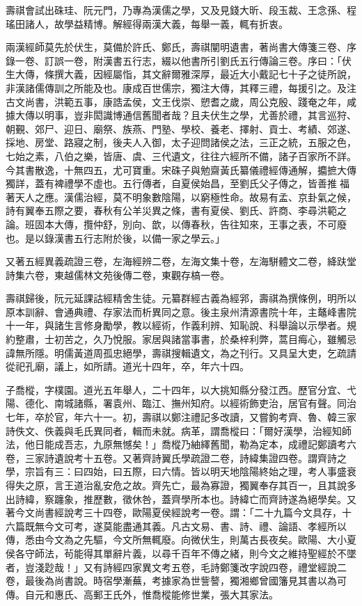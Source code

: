 \begin{pinyinscope}
壽祺會試出硃珪、阮元門，乃專為漢儒之學，又及見錢大昕、段玉裁、王念孫、程瑤田諸人，故學益精博。解經得兩漢大義，每舉一義，輒有折衷。

兩漢經師莫先於伏生，莫備於許氏、鄭氏，壽祺闡明遺書，著尚書大傳箋三卷、序錄一卷、訂誤一卷，附漢書五行志，綴以他書所引劉氏五行傳論三卷。序曰：「伏生大傳，條撰大義，因經屬恉，其文辭爾雅深厚，最近大小戴記七十子之徒所說，非漢諸儒傳訓之所能及也。康成百世儒宗，獨注大傳，其釋三禮，每援引之。及注古文尚書，洪範五事，康誥孟侯，文王伐崇、愬耆之歲，周公克殷、踐奄之年，咸據大傳以明事，豈非閎識博通信舊聞者哉？且夫伏生之學，尤善於禮，其言巡狩、朝覲、郊尸、迎日、廟祭、族燕、門塾、學校、養老、擇射、貢士、考績、郊遂、採地、房堂、路寢之制，後夫人入御，太子迎問諸侯之法，三正之統，五服之色，七始之素，八伯之樂，皆唐、虞、三代遺文，往往六經所不備，諸子百家所不詳。今其書散逸，十無四五，尤可寶重。宋硃子與勉齋黃氏纂儀禮經傳通解，攟摭大傳獨詳，蓋有裨禮學不虛也。五行傳者，自夏侯始昌，至劉氏父子傳之，皆善推福著天人之應。漢儒治經，莫不明象數陰陽，以窮極性命。故易有孟、京卦氣之候，詩有翼奉五際之要，春秋有公羊災異之條，書有夏侯、劉氏、許商、李尋洪範之論。班固本大傳，攬仲舒，別向、歆，以傳春秋，告往知來，王事之表，不可廢也。是以錄漢書五行志附於後，以備一家之學云。」

又著五經異義疏證三卷，左海經辨二卷，左海文集十卷，左海駢體文二卷，絳趺堂詩集六卷，東越儒林文苑後傳二卷，東觀存槁一卷。

壽祺歸後，阮元延課詁經精舍生徒。元纂群經古義為經郛，壽祺為撰條例，明所以原本訓辭、會通典禮、存家法而析異同之意。後主泉州清源書院十年，主鼇峰書院十一年，與諸生言修身勵學，教以經術，作義利辨、知恥說、科舉論以示學者。規約整肅，士初苦之，久乃悅服。家居與諸當事書，於桑梓利弊，蒿目痗心，雖觸忌諱無所隱。明儒黃道周孤忠絕學，壽祺搜輯遺文，為之刊行。又具呈大吏，乞疏請從祀孔廟，議上，如所請。道光十四年，卒，年六十四。

子喬樅，字樸園。道光五年舉人，二十四年，以大挑知縣分發江西。歷官分宜、弋陽、德化、南城諸縣，署袁州、臨江、撫州知府。以經術飾吏治，居官有聲。同治七年，卒於官，年六十一。初，壽祺以鄭注禮記多改讀，又嘗鉤考齊、魯、韓三家詩佚文、佚義與毛氏異同者，輯而未就。病革，謂喬樅曰：「爾好漢學，治經知師法，他日能成吾志，九原無憾矣！」喬樅乃紬繹舊聞，勒為定本，成禮記鄭讀考六卷，三家詩遺說考十五卷。又著齊詩翼氏學疏證二卷，詩緯集證四卷。謂齊詩之學，宗旨有三：曰四始，曰五際，曰六情。皆以明天地陰陽終始之理，考人事盛衰得失之原，言王道治亂安危之故。齊先亡，最為寡證，獨翼奉存其百一，且其說多出詩緯，察躔象，推歷數，徵休咎，蓋齊學所本也。詩緯亡而齊詩遂為絕學矣。又著今文尚書經說考三十四卷，歐陽夏侯經說考一卷。謂：「二十九篇今文具存，十六篇既無今文可考，遂莫能盡通其義。凡古文易、書、詩、禮、論語、孝經所以傳，悉由今文為之先驅，今文所無輒廢。向微伏生，則萬古長夜矣。歐陽、大小夏侯各守師法，茍能得其單辭片義，以尋千百年不傳之緒，則今文之維持聖經於不墜者，豈淺尟哉！」又有詩經四家異文考五卷，毛詩鄭箋改字說四卷，禮堂經說二卷，最後為尚書說。時宿學漸蕪，考據家為世訾謷，獨湘鄉曾國籓見其書以為可傳。自元和惠氏、高郵王氏外，惟喬樅能修世業，張大其家法。


\end{pinyinscope}
